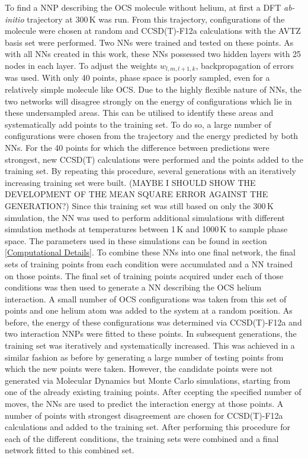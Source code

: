 \documentclass[12pt,titlepage]{article}
\begin{document}
To find a NNP describing the OCS molecule without helium, at first a DFT \textit{ab-initio} trajectory at 300\,K was run. From this trajectory, configurations of the molecule were chosen at random and CCSD(T)-F12a calculations with the AVTZ basis set were performed. Two NNs were trained and tested on these points. As with all NNs created in this work, these NNs possessed two hidden layers with 25 nodes in each layer. To adjust the weights $w_{l,m,l+1,k}$, backpropagation of errors\cite{Rumelhart1986} was used. With only 40 points, phase space is poorly sampled, even for a relatively simple molecule like OCS. Due to the highly flexible nature of NNs, the two networks will disagree strongly on the energy of configurations which lie in these undersampled areas. This can be utilised to identify these areas and systematically add points to the training set. To do so, a large number of configurations were chosen from the trajectory and the energy predicted by both NNs. For the 40 points for which the difference between predictions were strongest, new CCSD(T) calculations were performed and the points added to the training set. By repeating this procedure, several generations with an iteratively increasing training set were built.
 (MAYBE I SHOULD SHOW THE DEVELOPMENT OF THE MEAN SQUARE ERROR AGAINST THE GENERATION?)
Since this training set was still based on only the 300\,K simulation, the NN was used to perform additional simulations with different simulation methods at temperatures between 1\,K and 1000\,K to sample phase space. The parameters used  in these simulations can be found in section \ref{Computational Details}. To combine these NNs into one final network, the final sets of training points from each condition were accumulated and a NN trained on those points.
\newline
The final set of training points acquired under each of those conditions was then used to generate a NN describing the OCS helium interaction. 
A small number of OCS configurations was taken from this set of points and one helium atom was added to the system at a random position. As before, the energy of these configurations was determined via CCSD(T)-F12a and two interaction NNPs were fitted to these points. In subsequent generations, the training set was iteratively and systematically increased. This was achieved in a similar fashion as before by generating a large number of testing points from which the new points were taken. However, the candidate points were not generated via Molecular Dynamics but Monte Carlo simulations, starting from one of the already existing training points. After ccepting the specified number of moves, the NNs are used to predict the interaction energy at those points. A number of points with strongest disagreement are chosen for CCSD(T)-F12a calculations and added to the training set.
After performing this procedure for each of the different conditions, the training sets were combined and a final network fitted to this combined set.
\end{document}

